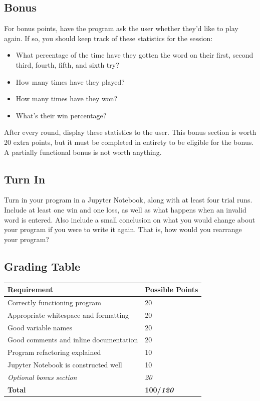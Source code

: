 \subsection*{Bonus}
For bonus points, have the program ask the user whether they'd like to play again. If so, you should keep track of these statistics for the session:
\begin{itemize}
\item What percentage of the time have they gotten the word on their first, second third, fourth, fifth, and sixth try?
\item How many times have they played?
\item How many times have they won?
\item What's their win percentage?
\end{itemize}
After every round, display these statistics to the user. This bonus section is worth 20 extra points, but it must be completed in entirety to be eligible for the bonus. A partially functional bonus is not worth anything.
\subsection*{Turn In}
Turn in your program in a Jupyter Notebook, along with at least four trial runs. Include at least one win and one loss, as well as what happens when an invalid word is entered. Also include a small conclusion on what you would change about your program if you were to write it again. That is, how would you rearrange your program?
\subsection*{Grading Table}
\begin{tabular}{|l|l|}
\hline
Requirement & Possible Points \\ \hline
Correctly functioning program & 20 \\ \hline
Appropriate whitespace and formatting & 20 \\ \hline
Good variable names & 20 \\ \hline
Good comments and inline documentation & 20 \\ \hline
Program refactoring explained & 10 \\ \hline
Jupyter Notebook is constructed well & 10 \\ \hline
\textit{Optional bonus section} & \textit{20} \\\hline
\textbf{Total} & \textbf{100/\textit{120}} \\ \hline
\end{tabular}